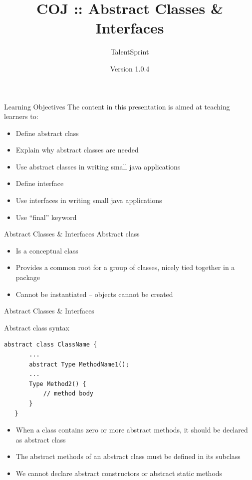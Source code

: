 \documentclass[14pt]{beamer}
\title[COJ:Java:05]{COJ :: Abstract Classes \& Interfaces}
\author[TS]{TalentSprint}
\institute[L\&D]{Licensed To Skill}
\date{Version 1.0.4}
\begin{document}
\begin{frame}
  \titlepage
\end{frame}

\begin{frame}{Learning Objectives}
The content in this presentation is aimed at teaching  learners to:
  \begin{itemize}
  \item Define abstract class
  \item Explain why abstract classes are needed
  \item Use abstract classes in writing small java applications
  \item Define interface
  \item Use interfaces in writing small java applications
  \item Use ``final'' keyword
  \end{itemize}
\end{frame}

\begin{frame}{Abstract Classes \& Interfaces}
Abstract class
 \begin{itemize}
  \item Is a conceptual class
  \item Provides a common root for a group of classes, nicely tied together in a package
  \item Cannot be instantiated -- objects cannot  be created
 \end{itemize}
\end{frame}

\begin{frame}[fragile]{Abstract Classes \& Interfaces}
 \begin{block}{Abstract class syntax}
  \begin{lstlisting}[numbers=none,  basicstyle=\tiny]
   abstract class ClassName {
       ...
       abstract Type MethodName1();
       ...
       Type Method2() {
           // method body
       }
   }
  \end{lstlisting}
 \end{block}
\begin{itemize}
 \item When a class contains zero or more abstract methods, it should be declared as abstract class
 \item The abstract methods of an abstract class must be defined in its subclass
 \item We cannot declare abstract constructors or abstract static methods
\end{itemize}
\end{frame}
\end{document}

